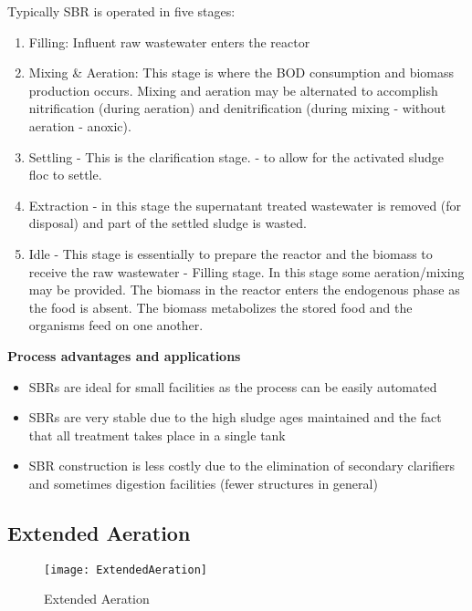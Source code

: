 Typically SBR is operated in five stages: 

\begin{enumerate}




\item Filling:  Influent raw wastewater enters the reactor 

\item Mixing \& Aeration:  This stage is where the BOD consumption and biomass production occurs.  Mixing and aeration may be alternated  to accomplish nitrification (during aeration) and denitrification (during mixing - without aeration - anoxic).

\item Settling - This is the clarification stage.  - to allow for the activated sludge floc to settle.

\item Extraction - in this stage the supernatant treated wastewater is removed (for disposal) and part of the settled sludge is wasted.

\item Idle - This stage is essentially to prepare the reactor and the biomass to receive the raw wastewater - Filling stage.  In this stage some aeration/mixing may be provided.  The biomass in the reactor enters the endogenous phase as the food is absent.  The biomass metabolizes the stored food and the organisms feed on one another.
\end{enumerate}


\noindent \textbf{Process advantages and applications}
\begin{itemize}
\item SBRs are ideal for small facilities as the process can be easily automated

\item SBRs are very stable due to the high sludge ages maintained and the fact that all treatment takes place in a single tank

\item SBR construction is less costly due to the elimination of secondary clarifiers and sometimes digestion facilities (fewer structures in general)
\end{itemize}


\subsection{Extended Aeration}

\begin{figure}[h!]
\begin{center}
\texttt{[image: ExtendedAeration]}
\caption{Extended Aeration}
\end{center}
\end{figure}

